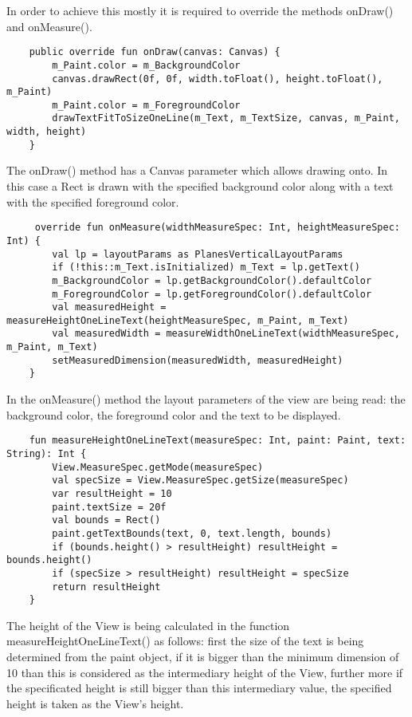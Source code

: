In order to achieve this mostly it is required to override the methods onDraw() and onMeasure().

\begin{lstlisting}
	public override fun onDraw(canvas: Canvas) {
		m_Paint.color = m_BackgroundColor
		canvas.drawRect(0f, 0f, width.toFloat(), height.toFloat(), m_Paint)
		m_Paint.color = m_ForegroundColor
		drawTextFitToSizeOneLine(m_Text, m_TextSize, canvas, m_Paint, width, height)
	}
\end{lstlisting}

The onDraw() method has a Canvas parameter which allows drawing onto. In this case a Rect is drawn with the specified background color along with a text with the specified foreground color. 

\begin{lstlisting}
	 override fun onMeasure(widthMeasureSpec: Int, heightMeasureSpec: Int) {
		val lp = layoutParams as PlanesVerticalLayoutParams
		if (!this::m_Text.isInitialized) m_Text = lp.getText()
		m_BackgroundColor = lp.getBackgroundColor().defaultColor
		m_ForegroundColor = lp.getForegroundColor().defaultColor
		val measuredHeight = measureHeightOneLineText(heightMeasureSpec, m_Paint, m_Text)
		val measuredWidth = measureWidthOneLineText(widthMeasureSpec, m_Paint, m_Text)
		setMeasuredDimension(measuredWidth, measuredHeight)
	}
\end{lstlisting}

In the onMeasure() method the layout parameters of the view are being read: the background color, the foreground color and the text to be displayed.

\begin{lstlisting}
	fun measureHeightOneLineText(measureSpec: Int, paint: Paint, text: String): Int {
		View.MeasureSpec.getMode(measureSpec)
		val specSize = View.MeasureSpec.getSize(measureSpec)
		var resultHeight = 10
		paint.textSize = 20f
		val bounds = Rect()
		paint.getTextBounds(text, 0, text.length, bounds)
		if (bounds.height() > resultHeight) resultHeight = bounds.height()
		if (specSize > resultHeight) resultHeight = specSize
		return resultHeight
	}
\end{lstlisting}

The height of the View is being calculated in the function measureHeightOneLineText() as follows: first the size of the text is being determined from the paint object, if it is bigger than the minimum dimension of 10 than this is considered as the intermediary height of the View, further more if the specificated height is still bigger than this intermediary value, the specified height is taken as the View's height.

